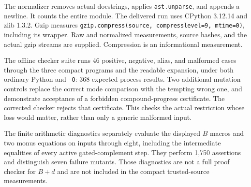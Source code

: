 The normalizer removes actual docstrings, applies \texttt{ast.unparse},
and appends a newline. It counts the entire module. The delivered run
uses CPython 3.12.14 and zlib 1.3.2. Gzip measures
\texttt{gzip.compress(source, compresslevel=9, mtime=0)}, including its
wrapper. Raw and normalized measurements, source hashes, and the actual
gzip streams are supplied. Compression is an informational measurement.

The offline checker suite runs 46 positive, negative, alias, and malformed
cases through the three compact programs and the readable expansion,
under both ordinary Python and \texttt{-O}: 368 expected process results.
Two additional mutation controls replace the correct mode comparison
with the tempting wrong one, and demonstrate acceptance of a forbidden
compound-progress certificate. The corrected checker rejects that
certificate. This checks the actual restriction whose loss would matter,
rather than only a generic malformed input.

The finite arithmetic diagnostics separately evaluate the displayed
$B$ macros and two monus equations on inputs through eight, including
the intermediate equalities of every active gated-complement step.
They perform 1,750 assertions and distinguish seven failure mutants.
Those diagnostics are not a full proof checker for $B+d$ and are not
included in the compact trusted-source measurements.


